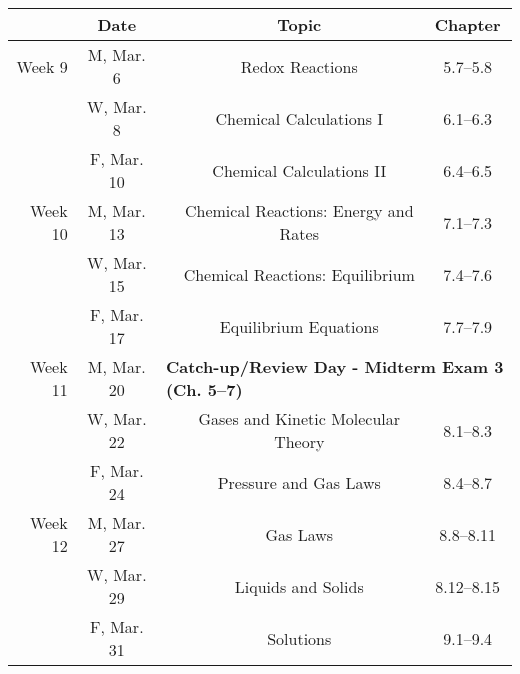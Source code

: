 \documentclass[12pt, letterpaper]{article}
\begin{document}
\noindent
\begin{tabular}{rcccc}
	            & Date       &                                                                                & Topic                                & Chapter      \\
	\midrule
	Week 9      & M, Mar. 6  &                                                                                & Redox Reactions                      & 5.7--5.8     \\
	            & W, Mar. 8  &                                                                                & Chemical Calculations I              & 6.1--6.3     \\
	            & F, Mar. 10 &                                                                                & Chemical Calculations II             & 6.4--6.5     \\
	\midrule
	Week 10     & M, Mar. 13 &                                                                                & Chemical Reactions: Energy and Rates & 7.1--7.3     \\
	            & W, Mar. 15 &                                                                                & Chemical Reactions: Equilibrium      & 7.4--7.6     \\
	            & F, Mar. 17 &                                                                                & Equilibrium Equations                & 7.7--7.9     \\
	\midrule
	Week 11     & M, Mar. 20 & \multicolumn{3}{l}{\textbf{Catch-up/Review Day - Midterm Exam 3 (Ch. 5--7)}}                                                         \\
	            & W, Mar. 22 &                                                                                & Gases and Kinetic Molecular Theory   & 8.1--8.3     \\
	            & F, Mar. 24 &                                                                                & Pressure and Gas Laws                & 8.4--8.7     \\
	\midrule
	Week 12     & M, Mar. 27 &                                                                                & Gas Laws                             & 8.8--8.11    \\
	            & W, Mar. 29 &                                                                                & Liquids and Solids                   & 8.12--8.15   \\
	            & F, Mar. 31 &                                                                                & Solutions                            & 9.1--9.4     \\

\end{tabular}
\end{document}

